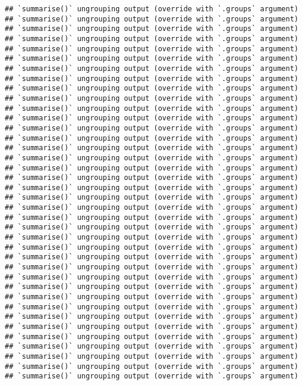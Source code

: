 \documentclass[
]{article}
\begin{document}
\begin{verbatim}
## `summarise()` ungrouping output (override with `.groups` argument)
## `summarise()` ungrouping output (override with `.groups` argument)
## `summarise()` ungrouping output (override with `.groups` argument)
## `summarise()` ungrouping output (override with `.groups` argument)
## `summarise()` ungrouping output (override with `.groups` argument)
## `summarise()` ungrouping output (override with `.groups` argument)
## `summarise()` ungrouping output (override with `.groups` argument)
## `summarise()` ungrouping output (override with `.groups` argument)
## `summarise()` ungrouping output (override with `.groups` argument)
## `summarise()` ungrouping output (override with `.groups` argument)
## `summarise()` ungrouping output (override with `.groups` argument)
## `summarise()` ungrouping output (override with `.groups` argument)
## `summarise()` ungrouping output (override with `.groups` argument)
## `summarise()` ungrouping output (override with `.groups` argument)
## `summarise()` ungrouping output (override with `.groups` argument)
## `summarise()` ungrouping output (override with `.groups` argument)
## `summarise()` ungrouping output (override with `.groups` argument)
## `summarise()` ungrouping output (override with `.groups` argument)
## `summarise()` ungrouping output (override with `.groups` argument)
## `summarise()` ungrouping output (override with `.groups` argument)
## `summarise()` ungrouping output (override with `.groups` argument)
## `summarise()` ungrouping output (override with `.groups` argument)
## `summarise()` ungrouping output (override with `.groups` argument)
## `summarise()` ungrouping output (override with `.groups` argument)
## `summarise()` ungrouping output (override with `.groups` argument)
## `summarise()` ungrouping output (override with `.groups` argument)
## `summarise()` ungrouping output (override with `.groups` argument)
## `summarise()` ungrouping output (override with `.groups` argument)
## `summarise()` ungrouping output (override with `.groups` argument)
## `summarise()` ungrouping output (override with `.groups` argument)
## `summarise()` ungrouping output (override with `.groups` argument)
## `summarise()` ungrouping output (override with `.groups` argument)
## `summarise()` ungrouping output (override with `.groups` argument)
## `summarise()` ungrouping output (override with `.groups` argument)
## `summarise()` ungrouping output (override with `.groups` argument)
## `summarise()` ungrouping output (override with `.groups` argument)
## `summarise()` ungrouping output (override with `.groups` argument)
## `summarise()` ungrouping output (override with `.groups` argument)
\end{verbatim}
\end{document}
